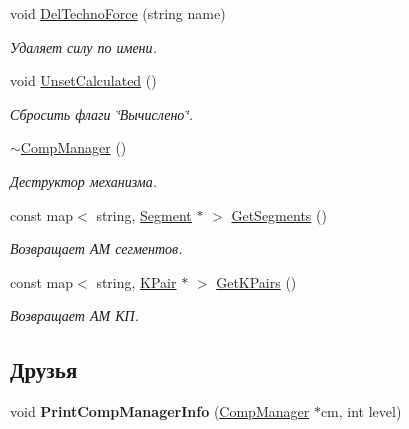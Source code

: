 \begin{DoxyCompactItemize}
void \hyperlink{class_comp_manager_a9029ca9d910c0a768cde3ba354d8b2cc}{DelTechnoForce} (string name)
\begin{DoxyCompactList}\small\item\em Удаляет силу по имени. \item\end{DoxyCompactList}\item 
void \hyperlink{class_comp_manager_a1ed6c3cf414fd38d18193457c01a59e8}{UnsetCalculated} ()
\begin{DoxyCompactList}\small\item\em Сбросить флаги \char`\"{}Вычислено\char`\"{}. \item\end{DoxyCompactList}\item 
\hyperlink{class_comp_manager_a028278fd6a765ccd63b7b8f2596b501f}{$\sim$CompManager} ()
\begin{DoxyCompactList}\small\item\em Деструктор механизма. \item\end{DoxyCompactList}\item 
const map$<$ string, \hyperlink{class_segment}{Segment} $\ast$ $>$ \hyperlink{class_comp_manager_ad06433257a643f6c256d0f5d6a886266}{GetSegments} ()
\begin{DoxyCompactList}\small\item\em Возвращает АМ сегментов. \item\end{DoxyCompactList}\item 
const map$<$ string, \hyperlink{class_k_pair}{KPair} $\ast$ $>$ \hyperlink{class_comp_manager_a8f9c981e2d449679b7c2e41d6904d6f0}{GetKPairs} ()
\begin{DoxyCompactList}\small\item\em Возвращает АМ КП. \item\end{DoxyCompactList}\end{DoxyCompactItemize}
\subsection*{Друзья}
\begin{DoxyCompactItemize}
\item 
\hypertarget{class_comp_manager_a6b39947aaeec9f8319012e66f7469bcf}{
void {\bfseries PrintCompManagerInfo} (\hyperlink{class_comp_manager}{CompManager} $\ast$cm, int level)}
\label{class_comp_manager_a6b39947aaeec9f8319012e66f7469bcf}

\end{DoxyCompactItemize}


